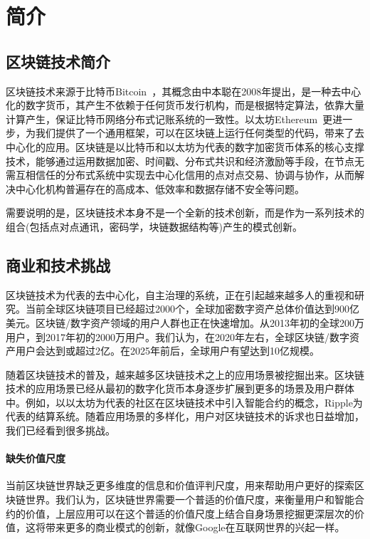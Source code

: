 \section{简介}

\subsection{区块链技术简介}
区块链技术来源于比特币Bitcoin~\cite{Nakamoto2008}，其概念由中本聪在2008年提出，是一种去中心化的数字货币，其产生不依赖于任何货币发行机构，而是根据特定算法，依靠大量计算产生，保证比特币网络分布式记账系统的一致性。以太坊Ethereum~\cite{buterin2014ethereum}更进一步，为我们提供了一个通用框架，可以在区块链上运行任何类型的代码，带来了去中心化的应用。区块链是以比特币和以太坊为代表的数字加密货币体系的核心支撑技术，能够通过运用数据加密、时间戳、分布式共识和经济激励等手段，在节点无需互相信任的分布式系统中实现去中心化信用的点对点交易、协调与协作，从而解决中心化机构普遍存在的高成本、低效率和数据存储不安全等问题。

需要说明的是，区块链技术本身不是一个全新的技术创新，而是作为一系列技术的组合(包括点对点通讯，密码学，块链数据结构等)产生的模式创新。

\subsection{商业和技术挑战}
区块链技术为代表的去中心化，自主治理的系统，正在引起越来越多人的重视和研究。当前全球区块链项目已经超过2000个，全球加密数字资产总体价值达到900亿美元。区块链/数字资产领域的用户人群也正在快速增加。从2013年初的全球200万用户，到2017年初的2000万用户。我们认为，在2020年左右，全球区块链/数字资产用户会达到或超过2亿。在2025年前后，全球用户有望达到10亿规模。

随着区块链技术的普及，越来越多区块链技术之上的应用场景被挖掘出来。区块链技术的应用场景已经从最初的数字化货币本身逐步扩展到更多的场景及用户群体中。例如，以以太坊为代表的社区在区块链技术中引入智能合约的概念，Ripple为代表的结算系统。随着应用场景的多样化，用户对区块链技术的诉求也日益增加，我们已经看到很多挑战。

\paragraph{缺失价值尺度}当前区块链世界缺乏更多维度的信息和价值评判尺度，用来帮助用户更好的探索区块链世界。我们认为，区块链世界需要一个普适的价值尺度，来衡量用户和智能合约的价值，上层应用可以在这个普适的价值尺度上结合自身场景挖掘更深层次的价值，这将带来更多的商业模式的创新，就像Google在互联网世界的兴起一样。


